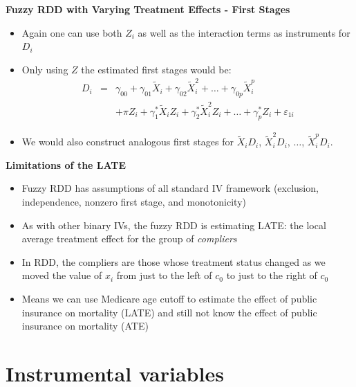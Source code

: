 \documentclass[notes=show]{beamer}
\begin{document}
\begin{frame}[plain]
	\begin{center}
	\textbf{Fuzzy RDD with Varying Treatment Effects - First Stages}
	\end{center}
	
	\begin{itemize}
	\item Again one can use both $Z_i$ as well as the interaction terms as instruments for $D_i$
	\item Only using $Z$ the estimated first stages would be:
		\begin{eqnarray*}
		D_i &=& \gamma_{00} + \gamma_{01}\tilde{X}_i + \gamma_{02}\tilde{X}_i^2 + \dots + \gamma_{0p}\tilde{X}_i^p \\
		& & + \pi Z_i + \gamma_1^*\tilde{X}_iZ_i + \gamma_2^* \tilde{X}_i^2Z_i + \dots + \gamma_p^*Z_i + \varepsilon_{1i}
		\end{eqnarray*}
	\item We would also construct analogous first stages for $\tilde{X}_iD_i$, $\tilde{X}_i^2D_i$, $\dots$, $\tilde{X}_i^pD_i$.
	\end{itemize}
\end{frame}

\begin{frame}[plain]
	\begin{center}
	\textbf{Limitations of the LATE}
	\end{center}
	
	\begin{itemize}
	\item Fuzzy RDD has assumptions of all standard IV framework (exclusion, independence, nonzero first stage, and monotonicity)
	\item As with other binary IVs, the fuzzy RDD is estimating LATE: the local average treatment effect for the group of \emph{compliers}
	\item In RDD, the compliers are those whose treatment status changed as we moved the value of $x_i$ from just to the left of $c_0$ to just to the right of $c_0$
	\item Means we can use Medicare age cutoff to estimate the effect of public insurance on mortality (LATE) and still not know the effect of public insurance on mortality (ATE)
	\end{itemize}
\end{frame}



\section{Instrumental variables}
\end{document}
